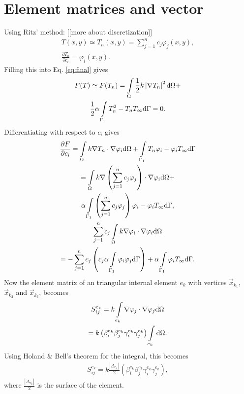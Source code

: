 \section{Element matrices and vector}
Using Ritz' method: [[more about discretization]]
\begin{gather*}
    T(x,y) \simeq T_n(x,y)=\sum_{j=1}^n c_j\varphi_j(x,y),\\
    \frac{\partial T_n}{\partial c_i}=\varphi_i(x,y).
\end{gather*} Filling this into Eq. \ref{eq:final} gives
\begin{gather*}
    F(T)\simeq F(T_n) = \int\displaylimits_{\Omega}\frac{1}{2} k \left|\nabla T_n\right|^2 \mathrm{d}\Omega + \\ \frac{1}{2}\alpha\int\displaylimits_{\Gamma_1}T_n^2-T_nT_{\infty} \mathrm{d}\Gamma = 0.
\end{gather*} Differentiating with respect to $c_i$ gives
\begin{gather*}
    \frac{\partial F}{\partial c_i} = \int\displaylimits_{\Omega}k\nabla T_n\cdot\nabla\varphi_i \mathrm{d}\Omega    +\int\displaylimits_{\Gamma_1}T_n\varphi_i-\varphi_iT_{\infty} \mathrm{d}\Gamma\\
    = \int\displaylimits_{\Omega}k\nabla\left(\sum_{j=1}^n c_j \varphi_j\right)\cdot \nabla \varphi_i \mathrm{d}\Omega + \\ \alpha\int\displaylimits_{\Gamma_1} \left(\sum_{j=1}^n c_j \varphi_j\right)\varphi_i - \varphi_i T_{\infty} \mathrm{d}\Gamma,\\
    \sum_{j=1}^n c_j \int\displaylimits_{\Omega}k\nabla\varphi_i\cdot \nabla \varphi_i \mathrm{d}\Omega \\
    = - \sum_{j=1}^n c_j\left(c_j\alpha\int\displaylimits_{\Gamma_1} \varphi_i \varphi_j \mathrm{d}\Gamma \right)+\alpha\int\displaylimits_{\Gamma_1}\varphi_i T_{\infty} \mathrm{d}\Gamma.
\end{gather*} Now the element matrix of an triangular internal element $e_k$ with vertices $\vec{x}_{k_1}$, $\vec{x}_{k_2}$ and $\vec{x}_{k_3}$, becomes
\begin{gather*}
    S_{ij}^{e_k} =  k\int\displaylimits_{e_k} \nabla \varphi_j \cdot \nabla \varphi_j \mathrm{d}\Omega \\
    = k\left(\beta_i^{e_k} \beta_j^{e_k} \gamma_i^{e_k} \gamma_j^{e_k} \right)\int\displaylimits_{e_k} \mathrm{d}\Omega.
\end{gather*} Using Holand \& Bell's theorem for the integral, this becomes
\begin{gather}
    S_{ij}^{e_k} = k \frac{|\Delta_{e_k}|}{2}\left(\beta_i^{e_k} \beta_j^{e_k} \gamma_i^{e_k} \gamma_j^{e_k} \right),
\end{gather} where $\frac{|\Delta_{e_k}|}{2}$ is the surface of the element.

